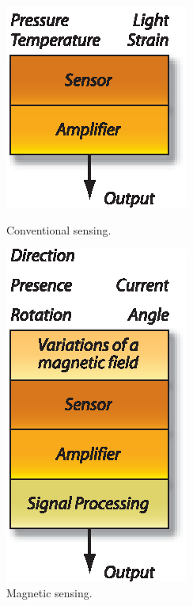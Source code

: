 \begin{subfigures}
\begin{figure}[!fbth]
 \centering\vfill
 \begin{minipage}{0.45\linewidth}\centering
      \includegraphics[width=.5\linewidth]{images/tradSensing}
 \caption[Traditional sensing]{Conventional sensing.}
 \label{fig:tradSensing}
 \end{minipage}\hfill
 \begin{minipage}{0.45\linewidth}\centering
  \includegraphics[width=.5\linewidth]{images/magnSensing}
 \caption[Magnetic sensing]{Magnetic sensing.}
 \label{fig:magnSensing}
 \end{minipage}
\end{figure}
\end{subfigures}

